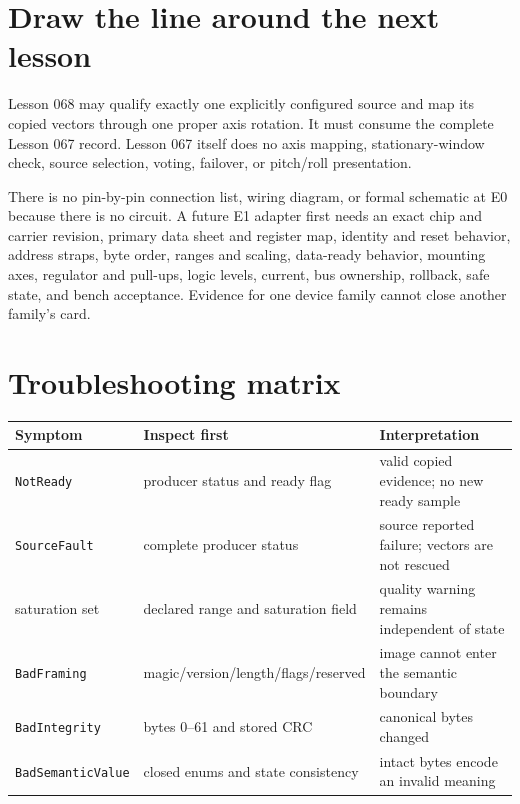 \documentclass[10pt]{article}
\begin{document}
\newpage
\section{Draw the line around the next lesson}
Lesson 068 may qualify exactly one explicitly configured source and map its
copied vectors through one proper axis rotation. It must consume the complete
Lesson 067 record. Lesson 067 itself does no axis mapping, stationary-window
check, source selection, voting, failover, or pitch/roll presentation.

There is no pin-by-pin connection list, wiring diagram, or formal schematic at
E0 because there is no circuit. A future E1 adapter first needs an exact chip
and carrier revision, primary data sheet and register map, identity and reset
behavior, address straps, byte order, ranges and scaling, data-ready behavior,
mounting axes, regulator and pull-ups, logic levels, current, bus ownership,
rollback, safe state, and bench acceptance. Evidence for one device family
cannot close another family's card.

\section{Troubleshooting matrix}
\begin{tabularx}{\linewidth}{@{}l X X@{}}
\toprule
Symptom & Inspect first & Interpretation\\
\midrule
\texttt{NotReady} & producer status and ready flag & valid copied evidence; no new ready sample\\
\texttt{SourceFault} & complete producer status & source reported failure; vectors are not rescued\\
saturation set & declared range and saturation field & quality warning remains independent of state\\
\texttt{BadFraming} & magic/version/length/flags/reserved & image cannot enter the semantic boundary\\
\texttt{BadIntegrity} & bytes 0--61 and stored CRC & canonical bytes changed\\
\texttt{BadSemanticValue} & closed enums and state consistency & intact bytes encode an invalid meaning\\
\bottomrule
\end{tabularx}
\end{document}
